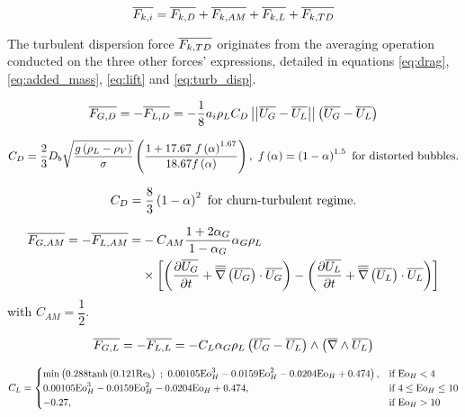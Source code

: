 \begin{equation}
\label{eq:force_balance}
\overline{F_{k,i}}=\overline{F_{k,D}} + \overline{F_{k,AM}} +\overline{F_{k,L}} +\overline{F_{k,TD}}
\end{equation}

The turbulent dispersion force $\overline{F_{k,TD}}$ originates from the averaging operation conducted on the three other forces' expressions, detailed in equations \ref{eq:drag}, \ref{eq:added_mass}, \ref{eq:lift} and \ref{eq:turb_disp}.


\begin{equation}
\label{eq:drag}
\overline{F_{G,D}}=-\overline{F_{L,D}}=-\frac{1}{8}a_{i}\rho_{L}C_{D}\left|\left|{ \overline{U_{G}}-\overline{U_{L}} }\right|\right|\left( \overline{U_{G}}-\overline{U_{L}}  \right)
\end{equation}

\begin{equation}
C_{D} = \frac{2}{3}D_{b}\sqrt{\dfrac{g\parth{\rho_{L}-\rho_{V}}}{\sigma}}\parth{ \frac{1 + 17.67~f\parth{\alpha}^{1.67}}{18.67f\parth{\alpha}} }, \ f\parth{\alpha} = \parth{1-\alpha}^{1.5}\ \text{for distorted bubbles.}
\end{equation}

\begin{equation}
C_{D} = \frac{8}{3} \left( 1-\alpha \right)^{2}\ \text{for churn-turbulent regime.}
\end{equation}

\begin{align}
\overline{F_{G,AM}}=-\overline{F_{L,AM}}=&-C_{AM} \frac{1+2\alpha_{G}}{1-\alpha_{G}}\alpha_{G}\rho_{L}\\
&\times \left[  \left( \frac{\partial{\overline{U_{G}}}}{\partial t}+\overline{\overline{\nabla}}\left({\overline{U_{G}}}\right)\cdot \overline{U_{G}}  \right) - \left( \frac{\partial{\overline{U_{L}}}}{\partial t}+\overline{\overline{\nabla}}\left({\overline{U_{L}}}\right)\cdot \overline{U_{L}}  \right)  \right]
\label{eq:added_mass}
\end{align}
with $C_{AM}=\dfrac{1}{2}$.

\begin{equation}
\label{eq:lift}
\overline{F_{G,L}}=-\overline{F_{L,L}}=-C_{L}\alpha_{G}\rho_{L}\left( \overline{U_{G}}-\overline{U_{L}}  \right)\wedge \left( \overline{\nabla}\wedge{\overline{U_{L}}}  \right)
\end{equation}

\begin{equation}
C_{L} = \begin{cases}
    \min{0.288\tanh{0.121\Re_{b}}\ ;\ 0.00105 \Eo_{H}^{3}-0.0159\Eo_{H}^{2} - 0.0204\Eo_{H}+0.474}, & \text{if}\ \Eo_{H}<4\\
   0.00105 \Eo_{H}^{3}-0.0159\Eo_{H}^{2} - 0.0204\Eo_{H}+0.474, & \text{if}\ 4\leq \Eo_{H} \leq 10\\
   -0.27, & \text{if}\ \Eo_{H}>10
  \end{cases}
\end{equation}




